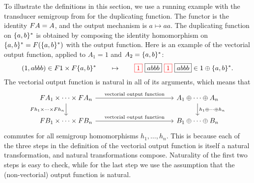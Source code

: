     To illustrate the definitions in this section, we use a running example with the transducer semigroup  from  for the duplicating function. The functor is the identity $\functor A = A$, and the output mechanism is $a \mapsto aa$. The duplicating function on $\{a,b\}^*$ is obtained by composing the identity homomorphism on $\set{a,b}^* = 
\functor(\set{a,b}^*)$
    with the output function.
    Here is an example of  the vectorial output function, applied to $A_1=1$ and $A_2=\{a,b\}^*$:
\begin{align*}
    (1,abbb) \in \functor 1 \times \functor \set{a,b}^* \qquad \mapsto \qquad 
\red{\boxed{1}}\  \boxed{abbb} \ \red{\boxed{1}} \  \boxed{abbb} \in 1 \oplus \set{a,b}^*.
\end{align*}
The  vectorial output function is natural in all of its arguments, which means that  
\[
\begin{tikzcd}
    [column sep=4cm]
\functor A_1 \times \cdots \times \functor A_n
\ar[r,"\text{vectorial output function}"]
\ar[d,"\functor h_1 \times \cdots \times \functor h_n"']
&
A_1 \oplus \cdots \oplus A_n
\ar[d,"h_1 \oplus \cdots \oplus h_n"]
\\
\functor B_1 \times \cdots \times \functor B_n
\ar[r,"\text{vectorial output function}"]
&
B_1 \oplus \cdots \oplus B_n
\end{tikzcd}
\]
commutes
for all semigroup homomorphisms $h_1,\ldots,h_n$. This is because each of the three steps in the definition of the vectorial output function is itself a natural transformation, and natural transformations compose.  Naturality of the first two steps is easy to check, while for the last step we use the assumption that the (non-vectorial) output function is natural.




